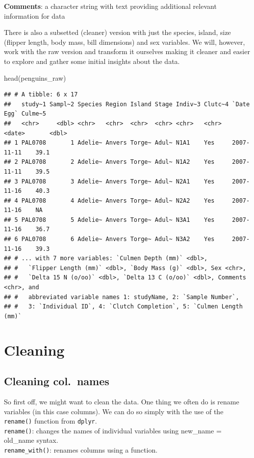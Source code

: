 \documentclass[
]{book}
\newenvironment{Shaded}{\begin{snugshade}}{\end{snugshade}}
\newcommand{\FunctionTok}[1]{\textcolor[rgb]{0.00,0.00,0.00}{#1}}
\newcommand{\NormalTok}[1]{#1}
\begin{document}
\textbf{Comments}: a character string with text providing additional relevant information for data

There is also a subsetted (cleaner) version with just the species, island, size (flipper length, body mass, bill dimensions) and sex variables.
We will, however, work with the raw version and transform it ourselves making it cleaner and easier to explore and gather some initial insights about the data.

\begin{Shaded}
\begin{Highlighting}[]
\FunctionTok{head}\NormalTok{(penguins\_raw)}
\end{Highlighting}
\end{Shaded}

\begin{verbatim}
## # A tibble: 6 x 17
##   study~1 Sampl~2 Species Region Island Stage Indiv~3 Clutc~4 `Date Egg` Culme~5
##   <chr>     <dbl> <chr>   <chr>  <chr>  <chr> <chr>   <chr>   <date>       <dbl>
## 1 PAL0708       1 Adelie~ Anvers Torge~ Adul~ N1A1    Yes     2007-11-11    39.1
## 2 PAL0708       2 Adelie~ Anvers Torge~ Adul~ N1A2    Yes     2007-11-11    39.5
## 3 PAL0708       3 Adelie~ Anvers Torge~ Adul~ N2A1    Yes     2007-11-16    40.3
## 4 PAL0708       4 Adelie~ Anvers Torge~ Adul~ N2A2    Yes     2007-11-16    NA  
## 5 PAL0708       5 Adelie~ Anvers Torge~ Adul~ N3A1    Yes     2007-11-16    36.7
## 6 PAL0708       6 Adelie~ Anvers Torge~ Adul~ N3A2    Yes     2007-11-16    39.3
## # ... with 7 more variables: `Culmen Depth (mm)` <dbl>,
## #   `Flipper Length (mm)` <dbl>, `Body Mass (g)` <dbl>, Sex <chr>,
## #   `Delta 15 N (o/oo)` <dbl>, `Delta 13 C (o/oo)` <dbl>, Comments <chr>, and
## #   abbreviated variable names 1: studyName, 2: `Sample Number`,
## #   3: `Individual ID`, 4: `Clutch Completion`, 5: `Culmen Length (mm)`
\end{verbatim}

\hypertarget{cleaning}{%
\section{Cleaning}\label{cleaning}}

\hypertarget{cleaning-col.-names}{%
\subsection{Cleaning col.~names}\label{cleaning-col.-names}}

So first off, we might want to clean the data.
One thing we often do is rename variables (in this case columns).
We can do so simply with the use of the \texttt{rename()} function from \texttt{dplyr}.\\
\texttt{rename()}: changes the names of individual variables using new\_name = old\_name syntax.\\
\texttt{rename\_with()}: renames columns using a function.
\end{document}
